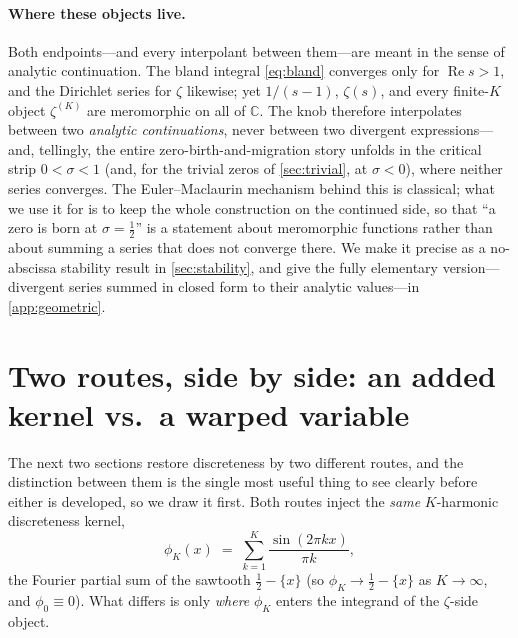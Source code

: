 \documentclass[11pt]{article}
\theoremstyle{definition}
\renewcommand{\Re}{\operatorname{Re}}
\begin{document}
\paragraph{Where these objects live.}
Both endpoints---and every interpolant between them---are meant in the sense of
analytic continuation. The bland integral \eqref{eq:bland} converges only for
$\Re s>1$, and the Dirichlet series for $\zeta$ likewise; yet $1/(s-1)$,
$\zeta(s)$, and every finite-$K$ object $\zeta^{(K)}$ are meromorphic on all of
$\mathbb{C}$. The knob therefore interpolates between two \emph{analytic
continuations}, never between two divergent expressions---and, tellingly, the
entire zero-birth-and-migration story unfolds in the critical strip
$0<\sigma<1$ (and, for the trivial zeros of \cref{sec:trivial}, at $\sigma<0$),
where neither series converges. The Euler--Maclaurin mechanism behind this is
classical; what we use it for is to keep the whole construction on the continued
side, so that ``a zero is born at $\sigma=\tfrac12$'' is a statement about
meromorphic functions rather than about summing a series that does not converge
there. We make it precise as a no-abscissa stability result in
\cref{sec:stability}, and give the fully elementary version---divergent series
summed in closed form to their analytic values---in \cref{app:geometric}.

\section{Two routes, side by side: an added kernel vs.\ a warped variable}
\label{sec:sidebyside}

The next two sections restore discreteness by two different routes, and the
distinction between them is the single most useful thing to see clearly before
either is developed, so we draw it first. Both routes inject the \emph{same}
$K$-harmonic discreteness kernel,
\begin{equation}\label{eq:phiK}
  \phi_K(x) \;=\; \sum_{k=1}^{K}\frac{\sin(2\pi k x)}{\pi k},
\end{equation}
the Fourier partial sum of the sawtooth $\tfrac12-\{x\}$ (so $\phi_K\to\tfrac12-\{x\}$
as $K\to\infty$, and $\phi_0\equiv0$). What differs is only \emph{where} $\phi_K$
enters the integrand of the $\zeta$-side object.
\end{document}
